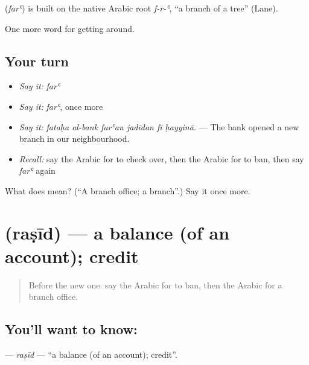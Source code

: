 \begin{cousinweb}
\textbf{} (\emph{farʿ}) is built on the native Arabic root \emph{f-r-ʿ}, \textquotedblleft{}a branch of a tree\textquotedblright{} (Lane).
\end{cousinweb}

\begin{grammarlens}[title={What you've built}]
One more word for getting around.
\end{grammarlens}

\subsection*{Your turn}
\begin{itemize}
\raggedright
  \item \emph{Say it:} \emph{farʿ}
  \item \emph{Say it:} \emph{farʿ}, once more
  \item \emph{Say it:} \emph{fataḥa al-bank farʿan jadīdan fī ḥayyinā.} — The bank opened a new branch in our neighbourhood.
  \item \emph{Recall:} say the Arabic for to check over, then the Arabic for to ban, then say \emph{farʿ} again
\end{itemize}

\begin{tcolorbox}[breakable,colback=teal!4,colframe=teal!35!black,title={Before you move on}]
What does  mean? (\textquotedblleft{}A branch office; a branch\textquotedblright{}.) Say it once more.
\end{tcolorbox}
\section[\texorpdfstring{\ar{رصيد} (raṣīd)}{رصيد (raṣīd)}]{ (raṣīd) — a balance (of an account); credit}

\label{lesson:AR-C452-rasid}



\begin{quote}
Before the new one: say the Arabic for to ban, then the Arabic for a branch office.
\end{quote}

\subsection*{You'll want to know: }
\textbf{} — \emph{raṣīd} — \textquotedblleft{}a balance (of an account); credit\textquotedblright{}.

